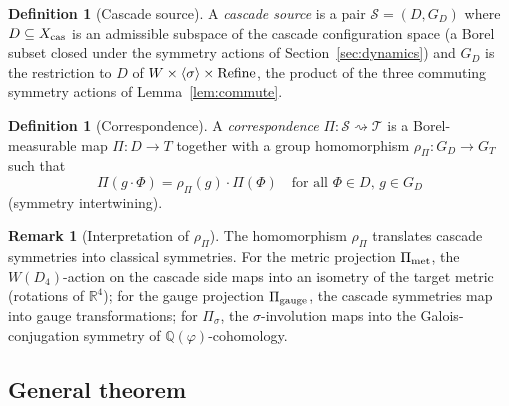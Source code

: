\documentclass[11pt, a4paper]{amsart}
\theoremstyle{definition}
\newtheorem{definition}[theorem]{Definition}
\newtheorem{remark}[theorem]{Remark}
\newcommand{\R}{\mathbb{R}}
\newcommand{\Q}{\mathbb{Q}}
\newcommand{\pphi}{\varphi}
\newcommand{\cas}{{\rm cas}}
\newcommand{\met}{{\rm met}}
\newcommand{\gge}{{\rm gauge}}
\begin{document}
\begin{definition}[Cascade source]
\label{def:source}
A \emph{cascade source} is a pair
$\mathcal{S} = (D, G_D)$ where $D \subseteq X_\cas$ is an
admissible subspace of the cascade configuration space (a Borel
subset closed under the symmetry actions of
Section~\ref{sec:dynamics}) and $G_D$ is the restriction to $D$ of
$W \times \langle \sigma \rangle \times {\rm Refine}$, the product
of the three commuting symmetry actions of
Lemma~\ref{lem:commute}.
\end{definition}

\begin{definition}[Correspondence]
\label{def:correspondence}
A \emph{correspondence}
$\Pi \colon \mathcal{S} \rightsquigarrow \mathcal{T}$ is a
Borel-measurable map $\Pi \colon D \to T$ together with a
group homomorphism $\rho_\Pi \colon G_D \to G_T$ such that
\[
  \Pi(g \cdot \Phi) = \rho_\Pi(g) \cdot \Pi(\Phi) \quad
    \text{for all } \Phi \in D,\, g \in G_D
\]
(symmetry intertwining).
\end{definition}

\begin{remark}[Interpretation of $\rho_\Pi$]
The homomorphism $\rho_\Pi$ translates cascade symmetries into
classical symmetries. For the metric projection $\Pi_{\met}$, the
$W(D_4)$-action on the cascade side maps into an isometry of the
target metric (rotations of $\R^4$); for the gauge projection
$\Pi_{\gge}$, the cascade symmetries map into gauge
transformations; for $\Pi_\sigma$, the $\sigma$-involution maps
into the Galois-conjugation symmetry of $\Q(\pphi)$-cohomology.
\end{remark}

\subsection{General theorem}
\label{subsec:general-thm}
\end{document}
